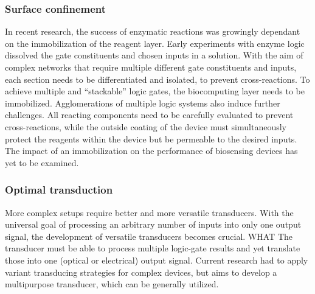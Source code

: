 \documentclass[runningheads]{llncs}
\begin{document}
\subsubsection{Surface confinement}	In recent research, the success of enzymatic reactions was growingly dependant on the immobilization of the reagent layer. Early experiments with enzyme logic dissolved the gate constituents and chosen inputs in a solution. With the aim of complex networks that require multiple different gate constituents and inputs, each section needs to be differentiated and isolated, to prevent cross-reactions. To achieve multiple and “stackable” logic gates, the biocomputing layer needs to be immobilized. Agglomerations of multiple logic systems also induce further challenges. All reacting components need to be carefully evaluated to prevent cross-reactions, while the outside coating of the device must simultaneously protect the reagents within the device but be permeable to the desired inputs. The impact of an immobilization on the performance of biosensing devices has yet to be examined.\\

\subsubsection{Optimal transduction}	More complex setups require better and more versatile transducers. With the universal goal of processing an arbitrary number of inputs into only one output signal, the development of versatile transducers becomes crucial. WHAT The transducer must be able to process multiple logic-gate results and yet translate those into one (optical or electrical) output signal. Current research had to apply variant transducing strategies for complex devices, but aims to develop a multipurpose transducer, which can be generally utilized.\\
\end{document}

